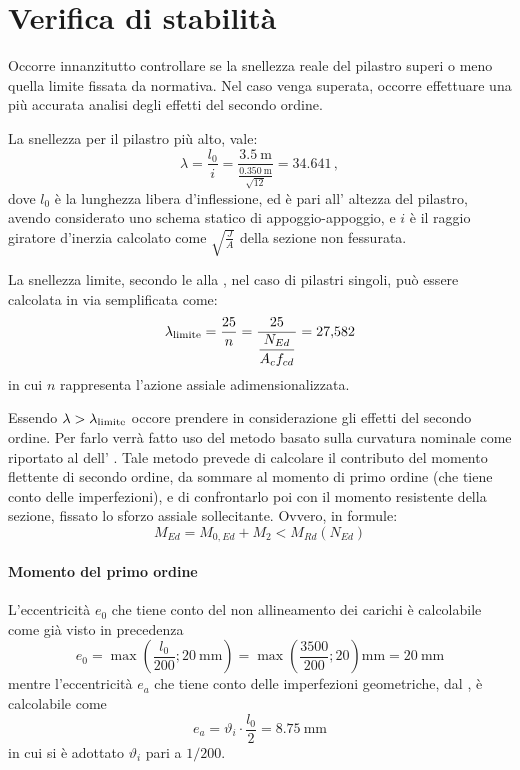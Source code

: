 \section{Verifica di stabilità}
Occorre innanzitutto controllare se la snellezza reale del pilastro superi o meno quella limite fissata da normativa. 
Nel caso venga superata, occorre effettuare una più accurata analisi degli effetti del secondo ordine.

La snellezza per il pilastro più alto, vale:
\begin{equation}
    \lambda = \frac{l_0}{i} = \frac{\SI{3.5}{\metre}}{\frac{\SI{0.350}{\metre}}{\sqrt{12}}} = \num{34.641} \, ,
\end{equation}
dove $l_0$ è la lunghezza libera d'inflessione, ed è pari all' altezza del pilastro, avendo considerato uno schema statico di appoggio-appoggio, 
e $i$ è il raggio giratore d'inerzia calcolato come $\sqrt{\frac{J}{A}}$ della sezione non fessurata.

La snellezza limite, secondo le  alla \normaref{[4.1.41]}, nel caso di pilastri singoli, può essere calcolata in via semplificata come:
\begin{equation}
    \lambda_\textup{limite} = \frac{25}{n} =  \frac{25}{\dfrac{N_{Ed}}{A_c f_{cd}}} = \num{27.582}
\end{equation}
in cui $n$ rappresenta l'azione assiale adimensionalizzata.

Essendo $\lambda > \lambda_\textup{limite}$ occore prendere in considerazione gli effetti del secondo ordine.
Per farlo verrà fatto uso del metodo basato sulla curvatura nominale come riportato al  dell' .
Tale metodo prevede di calcolare il contributo del momento flettente di secondo ordine, da sommare al momento di primo ordine (che tiene conto delle imperfezioni), e di confrontarlo poi con il momento resistente della sezione, fissato lo sforzo assiale sollecitante. 
Ovvero, in formule:
\begin{equation}
    M_{Ed} = M_{0,Ed} + M_2 < M_{Rd}(N_{Ed})
\end{equation}

\paragraph{Momento del primo ordine}
L'eccentricità $e_0$ che tiene conto del non allineamento dei carichi è calcolabile come già visto in precedenza
\[
    e_0 = \max \left(\frac{l_0}{200};  \SI{20}{\milli\metre} \right)  = \max \left(\frac{3500}{200};  20 \right)\si{\milli\metre} = \SI{20}{\milli\metre}
\]
mentre l'eccentricità $e_a$ che tiene conto delle imperfezioni geometriche, dal , è calcolabile come
\[
    e_a = \vartheta_i \cdot \frac{l_0}{2} = \SI{8.75}{\milli\metre}
\]
in cui si è adottato $\vartheta_i$ pari a $1/200$.

